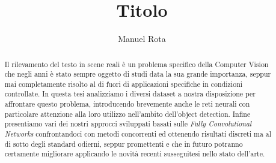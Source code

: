 \documentclass[12pt,a4paper]{report}
\begin{document}
\title{Titolo}
\author{Manuel Rota}

\begin{titlepage}
	
\end{titlepage}

\begin{abstract}
	Il rilevamento del testo in scene reali è un problema specifico della Computer Vision che negli anni è stato sempre oggetto di studi data la sua grande importanza, seppur mai completamente risolto al di fuori di applicazioni specifiche in condizioni controllate.
	In questa tesi analizziamo i diversi dataset a nostra disposizione per affrontare questo problema, introducendo brevemente anche le reti neurali con particolare attenzione alla loro utilizzo nell'ambito dell'object detection.
	Infine presentiamo vari dei nostri approcci sviluppati basati sulle \textit{Fully Convolutional Networks} confrontandoci con metodi concorrenti ed ottenendo risultati discreti ma al di sotto degli standard odierni, seppur promettenti e che in futuro potranno certamente migliorare applicando le novità recenti susseguitesi nello stato dell'arte.
\end{abstract}


\tableofcontents










\end{document}
